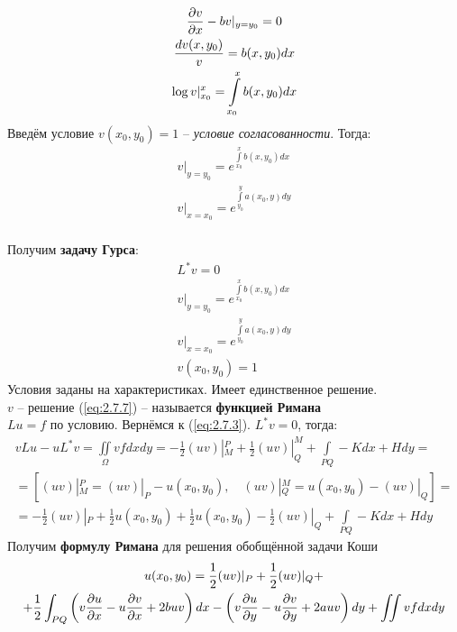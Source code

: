 \documentclass[../main.tex]{subfiles}
\begin{document}
\begin{gather*}
    \frac{\partial v}{\partial x}-bv|_{y=y_0} = 0\\
    \frac{dv(x,y_0)}{v} = b(x,y_0)dx\\
    \log v|_{x_0}^x = \int\limits_{x_0}^x b(x,y_0)dx\\
\end{gather*}
Введём условие $v(x_0,y_0)=1$ -- \textit{условие согласованности}. Тогда:
\begin{gather}
    \label{eq:2.7.5}
    v|_{y=y_0} = e^{\int\limits_{x_0}^x b(x,y_0)dx}\\
    \label{eq:2.7.6}
    v|_{x=x_0} = e^{\int\limits_{y_0}^y a(x_0,y)dy}
\end{gather}
\\
Получим \textbf{задачу Гурса}:
\begin{equation}
    \begin{gathered}
        \label{eq:2.7.7}
        L^*v=0\\
        v|_{y=y_0} = e^{\int\limits_{x_0}^x b(x,y_0)dx}\\
        v|_{x=x_0} = e^{\int\limits_{y_0}^y a(x_0,y)dy}\\
        v(x_0,y_0)=1
    \end{gathered}
\end{equation}
Условия заданы на характеристиках. Имеет единственное решение.
\\
$v$ -- решение (\ref{eq:2.7.7}) -- называется \textbf{функцией Римана}
\\
$Lu=f$ по условию. Вернёмся к (\ref{eq:2.7.3}). $L^*v=0$, тогда:
\begin{gather*}
    vLu - uL^*v = \iint\limits_{\Omega} vfdxdy =
    -\frac{1}{2}(uv)|_M^P + \frac{1}{2}(uv)|_Q^M + \int\limits_{PQ}-Kdx + Hdy =\\=
    \left[(uv)|_M^P = (uv)|_P - u(x_0, y_0), \quad (uv)|_Q^M = u(x_0, y_0) - (uv)|_Q\right] =\\=
    -\frac{1}{2}(uv)|_P +\frac{1}{2} u(x_0, y_0) + \frac{1}{2} u(x_0, y_0) - \frac{1}{2}(uv)|_Q +
    \int\limits_{PQ}-Kdx+Hdy
\end{gather*}
Получим \textbf{формулу Римана} для решения обобщённой задачи Коши
\begin{equation}
    \begin{gathered}
        \label{eq:2.7.8}
        u(x_0,y_0) = \frac{1}{2}(uv)|_P + \frac{1}{2}(uv)|_Q+\\+
        \frac{1}{2}\int_{PQ}\left(v\frac{\partial u}{\partial x} - u\frac{\partial v}{\partial x} + 2buv\right)dx -
        \left(v\frac{\partial u}{\partial y} - u\frac{\partial v}{\partial y} + 2auv\right)dy +
        \iint\limits vfdxdy
    \end{gathered}
\end{equation}
\end{document}
